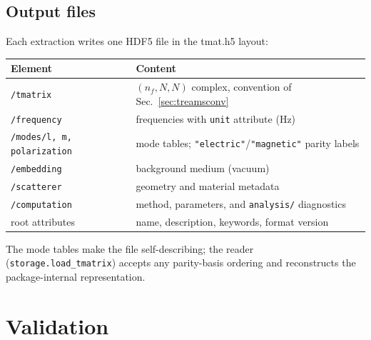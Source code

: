 \documentclass[11pt]{article}
\begin{document}
\subsection{Output files}
Each extraction writes one HDF5 file in the tmat.h5 layout:
\begin{center}
\begin{tabular}{ll}
\toprule
Element & Content\\
\midrule
\texttt{/tmatrix} & $(n_f, N, N)$ complex, convention of
 Sec.~\ref{sec:treamsconv}\\
\texttt{/frequency} & frequencies with \texttt{unit} attribute (Hz)\\
\texttt{/modes/l, m, polarization} & mode tables;
 \texttt{"electric"}/\texttt{"magnetic"} parity labels\\
\texttt{/embedding} & background medium (vacuum)\\
\texttt{/scatterer} & geometry and material metadata\\
\texttt{/computation} & method, parameters, and
 \texttt{analysis/} diagnostics\\
root attributes & name, description, keywords, format version\\
\bottomrule
\end{tabular}
\end{center}
The mode tables make the file self-describing; the reader
(\texttt{storage.load\_tmatrix}) accepts any parity-basis ordering and
reconstructs the package-internal representation.

\section{Validation}
\label{sec:validation}
\end{document}
